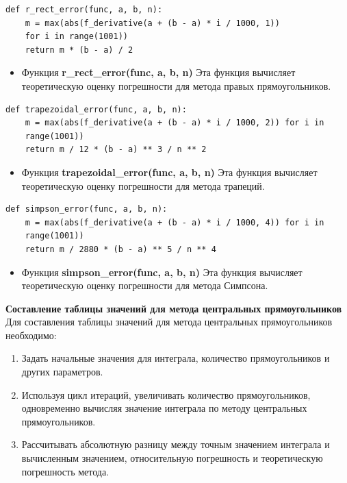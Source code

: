 \documentclass{article}
\begin{document}
\begin{lstlisting}
def r_rect_error(func, a, b, n):
    m = max(abs(f_derivative(a + (b - a) * i / 1000, 1)) 
    for i in range(1001))
    return m * (b - a) / 2
\end{lstlisting}

\begin{itemize}
\item Функция \textbf{r\_rect\_error(func, a, b, n)} Эта функция вычисляет теоретическую оценку погрешности для метода правых прямоугольников.
\end{itemize}

\begin{lstlisting}
def trapezoidal_error(func, a, b, n):
    m = max(abs(f_derivative(a + (b - a) * i / 1000, 2)) for i in
    range(1001))
    return m / 12 * (b - a) ** 3 / n ** 2
\end{lstlisting}

\begin{itemize}
\item Функция \textbf{trapezoidal\_error(func, a, b, n)} Эта функция вычисляет теоретическую оценку погрешности для метода трапеций.
\end{itemize}

\begin{lstlisting}
def simpson_error(func, a, b, n):
    m = max(abs(f_derivative(a + (b - a) * i / 1000, 4)) for i in
    range(1001))
    return m / 2880 * (b - a) ** 5 / n ** 4
\end{lstlisting}

\begin{itemize}
\item Функция \textbf{simpson\_error(func, a, b, n)} Эта функция вычисляет теоретическую оценку погрешности для метода Симпсона.
\end{itemize}

\textbf{\large{Составление таблицы значений для метода центральных прямоугольников
}} \\

Для составления таблицы значений для метода центральных прямоугольников необходимо:
\begin{enumerate}
\item Задать начальные значения для интеграла, количество прямоугольников и других параметров.
\item Используя цикл итераций, увеличивать количество прямоугольников, одновременно вычисляя значение интеграла по методу центральных прямоугольников.
\item Рассчитывать абсолютную разницу между точным значением интеграла и вычисленным значением, относительную погрешность и теоретическую погрешность метода.

\end{enumerate}
\end{document}
